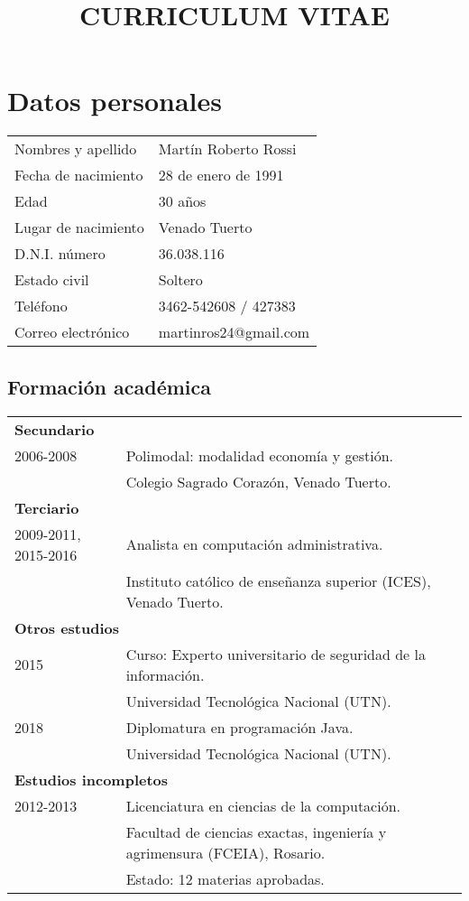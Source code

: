 \documentclass[12pt]{article}
\title{\huge{\textbf{CURRICULUM VITAE}}\vspace{-2.5ex}}
\date{}
\begin{document}
\maketitle
\section*{Datos personales}
\bgroup
\def\arraystretch{1.25}
\begin{tabular}{p{5cm} l}
  Nombres y apellido&Martín Roberto Rossi\\
  Fecha de nacimiento&28 de enero de 1991\\
  Edad&30 años\\
  Lugar de nacimiento&Venado Tuerto\\
  D.N.I. número&36.038.116\\
  Estado civil&Soltero\\
  Teléfono&3462-542608 / 427383\\
  Correo electrónico&martinros24@gmail.com\\
\end{tabular}
\setlength{\unitlength}{0.5cm}
\subsection*{Formación académica}
\begin{tabular}{p{3.8cm} l}
  \multicolumn{2}{l}{\textbf{Secundario}}\\
  2006-2008&Polimodal: modalidad economía y gestión.\\
           &\small{Colegio Sagrado Corazón, Venado Tuerto.}\\
  \multicolumn{2}{l}{\textbf{Terciario}}\\
  2009-2011, 2015-2016&Analista en computación administrativa.\\
           &\small{Instituto católico de enseñanza superior (ICES), Venado Tuerto.}\\
  \multicolumn{2}{l}{\textbf{Otros estudios}}\\
  2015&Curso: Experto universitario de seguridad de la información.\\
           &\small{Universidad Tecnológica Nacional (UTN).}\\
  2018&Diplomatura en programación Java.\\
           &\small{Universidad Tecnológica Nacional (UTN).}\\
  \multicolumn{2}{l}{\textbf{Estudios incompletos}}\\
  2012-2013&Licenciatura en ciencias de la computación.\\
           &\small{Facultad de ciencias exactas, ingeniería y agrimensura (FCEIA), Rosario.}\\
           &\small{Estado: 12 materias aprobadas.}\\
\end{tabular}
\end{document}
